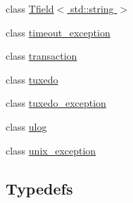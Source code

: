 \begin{DoxyCompactItemize}
\item 
class \hyperlink{classatmi_1_1_tfield_3_01std_1_1string_01_4}{Tfield$<$ std\+::string $>$}
\item 
class \hyperlink{classatmi_1_1timeout__exception}{timeout\+\_\+exception}
\item 
class \hyperlink{classatmi_1_1transaction}{transaction}
\item 
class \hyperlink{classatmi_1_1tuxedo}{tuxedo}
\item 
class \hyperlink{classatmi_1_1tuxedo__exception}{tuxedo\+\_\+exception}
\item 
class \hyperlink{classatmi_1_1ulog}{ulog}
\item 
class \hyperlink{classatmi_1_1unix__exception}{unix\+\_\+exception}
\end{DoxyCompactItemize}
\subsection*{Typedefs}
